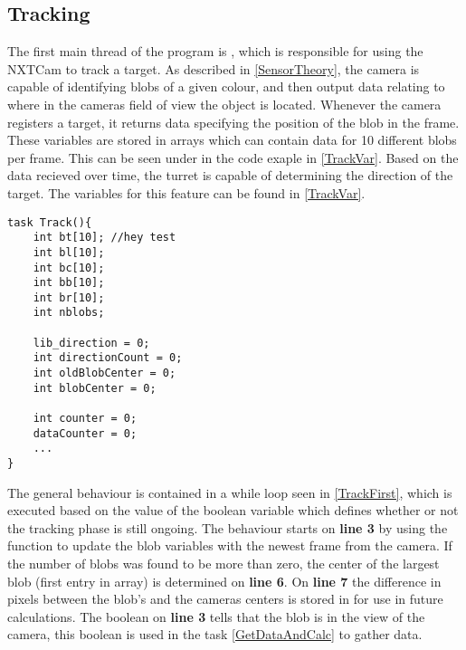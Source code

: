 \subsection{Tracking}
The first main thread of the program is , which is responsible
for using the NXTCam to track a target. As described in \autoref{SensorTheory}, the camera
is capable of identifying blobs of a given colour, and then output data relating to where
in the cameras field of view the object is located. Whenever the camera
registers a target, it returns data specifying the position of the blob in the
frame. These variables are stored in arrays which can contain data for 10
different blobs per frame. This can be seen under  in the code
exaple in \autoref{TrackVar}. Based on the data recieved over time, the turret is
capable of determining the direction of the target. The variables
for this feature can be found  in \autoref{TrackVar}.\nl
 
\begin{minipage}[H]{\linewidth}
\begin{lstlisting}[caption = Variables used on the Track() thread., label = TrackVar] 
task Track(){
    int bt[10];	//hey test
    int bl[10];
    int bc[10];
    int bb[10];
    int br[10];
    int nblobs;

    lib_direction = 0;
    int directionCount = 0;
    int oldBlobCenter = 0;
    int blobCenter = 0;

    int counter = 0;
    dataCounter = 0;
    ...
}
\end{lstlisting}
\end{minipage}

The general behaviour is contained in a while loop seen in \autoref{TrackFirst},
which is executed based on the value of the boolean variable
 which defines whether or not the tracking phase is still
ongoing. The behaviour starts on \textbf{line 3} by using the
 function to update the blob variables with
the newest frame from the camera. If the number of blobs was found to be more
than zero, the center of the largest blob (first entry in array) is determined on
\textbf{line 6}. On \textbf{line 7} the difference in pixels between the blob's
and the cameras centers is stored in  for use in future
calculations. The boolean on \textbf{line 3} tells that the blob is in the view
of the camera, this boolean is used in the  task
\autoref{GetDataAndCalc} to gather data.\nl
  
